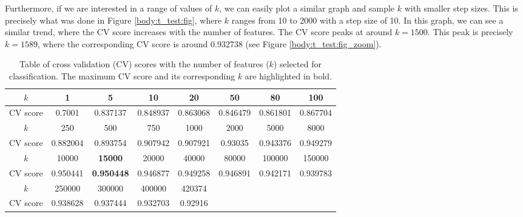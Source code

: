 \documentclass[12pt, twoside, a4paper]{report}
\begin{document}
Furthermore, if we are interested in a range of values of $k$, we can easily plot a similar graph and sample $k$ with smaller step sizes. This is precisely what was done in Figure \ref{body:t_test:fig}, where $k$ ranges from 10 to 2000 with a step size of 10. In this graph, we can see a similar trend, where the CV score increases with the number of features. The CV score peaks at around $k=1500$. This peak is precisely $k=1589$, where the corresponding CV score is around 0.932738 (see Figure \ref{body:t_test:fig_zoom}).


\begin{table}[]
\centering
\begin{tabular}{|c||c|c|c|c|c|c|c|}
\hline
$k$      & 1        & 5        & 10       & 20       & 50       & 80       & 100      \\ \hline
CV score & 0.7001   & 0.837137 & 0.848937 & 0.863068 & 0.846479 & 0.861801 & 0.867704 \\ \hline \hline
$k$      & 250      & 500      & 750      & 1000     & 2000     & 5000     & 8000     \\ \hline
CV score & 0.882004 & 0.893754 & 0.907942 & 0.907921 & 0.93035  & 0.943376 & 0.949279 \\ \hline \hline
$k$      & 10000    & \textbf{15000}    & 20000    & 40000    & 80000    & 100000   & 150000   \\ \hline
CV score & 0.950441 & \textbf{0.950448} & 0.946877 & 0.949258 & 0.946891 & 0.942171 & 0.939783 \\ \hline \hline
$k$      & 250000   & 300000   & 400000   & 420374   &          &          &          \\ \hline
CV score & 0.938628 & 0.937444 & 0.932703 & 0.92916  &          &          &          \\ \hline
\end{tabular}
\caption{Table of cross validation (CV) scores with the number of features ($k$) selected for classification. The maximum CV score and its corresponding $k$ are highlighted in bold.}
\label{t_test:table:range}
\end{table}
\end{document}
